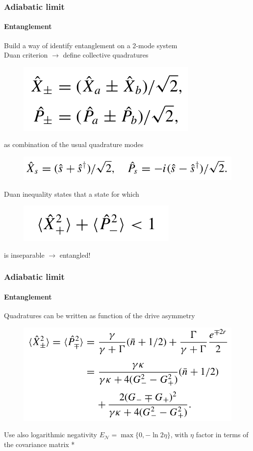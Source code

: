 \documentclass[aspectratio=43]{beamer}
\begin{document}
\begin{frame}
	
	\frametitle{Adiabatic limit}
	\framesubtitle{Entanglement}
	
	Build a way of identify entanglement on a 2-mode system\\
	{\color{blue}Duan criterion} $\longrightarrow$ define collective quadratures
	\begin{figure}
		\includegraphics[width = 4 cm]{plots/entanglement_quad.png}
	\end{figure}	
	
	as combination of the usual quadrature modes
	\begin{figure}
		\includegraphics[width = 7 cm]{plots/entanglement_quad_2.png}
	\end{figure}

	Duan inequality states that a state for which
	\begin{figure}
		\includegraphics[width = 3.5 cm]{plots/entanglement_duan_criterion.png}
	\end{figure}

	is inseparable $\longrightarrow$ {\color{blue}entangled!}

\end{frame}

\begin{frame}

	\frametitle{Adiabatic limit}
	\framesubtitle{Entanglement}
		
	Quadratures can be written as function of the drive asymmetry 
	\begin{figure}
		\includegraphics[width = 7.5 cm]{plots/entanglement_quadratures.png}
	\end{figure}

	Use also logarithmic negativity $E_{\mathcal{N}} = \max \{0, -\ln 2\eta \}$,
	with $\eta$ factor in terms of the covariance matrix {\color{blue}*}

\end{frame}
\end{document}
